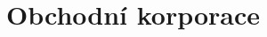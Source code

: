 \documentclass[ekobook.tex]{subfiles}
\begin{document}
\section{Obchodní korporace}
\newpage
\end{document}
